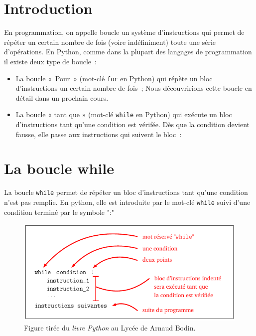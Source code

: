 
\vspace{-0.8cm}

\section{Introduction}
En programmation, on appelle boucle un système d’instructions qui permet de répéter un certain nombre de fois (voire indéfiniment) toute une série d’opérations. En Python, comme dans la plupart des langages de programmation il existe deux type de boucle :
\begin{itemize}
	\item La boucle « Pour » (mot-clé \lstinline{for} en Python) qui répète un bloc d’instructions un certain nombre de fois ; Nous découvririons cette boucle en détail dans un prochain cours.
	\item La boucle « tant que » (mot-clé \lstinline{while} en Python) qui exécute un bloc d’instructions tant qu’une condition est vérifée. Dès que la condition devient fausse, elle passe aux instructions qui suivent le bloc :
\end{itemize}



\section{La boucle \textsf{while}}

\begin{mydefinition} La boucle \lstinline{while} permet de répéter un bloc d'instructions tant qu'une condition n'est pas remplie. En python, elle est introduite par le mot-clé \lstinline{while} suivi d'une condition terminé par le symbole ":" 
\end{mydefinition}

\begin{figure}[h]
	\centering
	\includegraphics[scale=1]{Images/boucles/while-loop}
	\caption{Figure tirée du \textit{livre Python} au Lycée de Arnaud Bodin.}
\end{figure}

